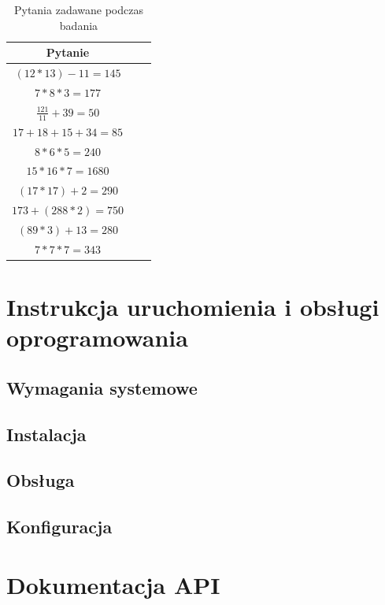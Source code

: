 \documentclass{./assets/wfis}
\begin{document}
\begin{table}[h]
    \centering
    \begin{tabular}{|c|c|c|}
        \hline
        Pytanie \\
        \hline
        $(12*13)-11=145$ \\
        $7*8*3=177$ \\
        $\frac{121}{11}+39=50$ \\
        $17+18+15+34=85$ \\
        $8*6*5=240$ \\
        $15*16*7=1680$ \\
        $(17*17)+2=290$ \\
        $173+(288*2)=750$ \\
        $(89*3)+13=280$ \\
        $7*7*7=343$ \\
        \hline
    \end{tabular}
    \caption{Pytania zadawane podczas badania}
    \label{pytania-badania}
\end{table}

\chapter{Instrukcja uruchomienia i obsługi oprogramowania}\label{instrukcja}
\section{Wymagania systemowe}
\section{Instalacja}
\section{Obsługa}
\section{Konfiguracja}
\chapter{Dokumentacja API}\label{api}
\end{document}

